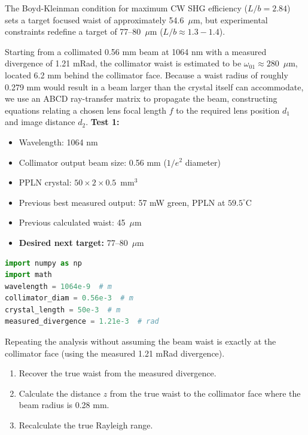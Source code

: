 \documentclass[11pt, letterpaper]{article}
\begin{document}
The Boyd-Kleinman condition for maximum CW SHG efficiency ($L/b = 2.84$) sets a target focused waist of approximately 54.6~$\mu$m, but experimental constraints redefine a target of 77--80~$\mu$m ($L/b \approx 1.3-1.4$). 

Starting from a collimated 0.56 mm beam at 1064 nm with a measured divergence of 1.21 mRad, the collimator waist is estimated to be $\omega_{01} \approx 280$~$\mu$m, located 6.2 mm behind the collimator face. Because a waist radius of roughly 0.279 mm would result in a beam larger than the crystal itself can accommodate, we use an ABCD ray-transfer matrix to propagate the beam, constructing equations relating a chosen lens focal length $f$ to the required lens position $d_{1}$ and image distance $d_{2}$.
\textbf{Test 1:}
\begin{itemize}
    \item Wavelength: 1064 nm
    \item Collimator output beam size: 0.56 mm ($1/e^2$ diameter)
    \item PPLN crystal: $50 \times 2 \times 0.5$~mm$^3$
    \item Previous best measured output: 57 mW green, PPLN at $59.5^\circ$C
    \item Previous calculated waist: 45~$\mu$m
    \item \textbf{Desired next target:} 77--80~$\mu$m
\end{itemize}

\begin{lstlisting}[language=Python]
import numpy as np
import math
wavelength = 1064e-9  # m
collimator_diam = 0.56e-3  # m
crystal_length = 50e-3  # m
measured_divergence = 1.21e-3  # rad
\end{lstlisting}

Repeating the analysis without assuming the beam waist is exactly at the collimator face (using the measured 1.21 mRad divergence).
\begin{enumerate}
\item Recover the true waist from the measured divergence.
\item Calculate the distance $z$ from the true waist to the collimator face where the beam radius is 0.28 mm.
\item Recalculate the true Rayleigh range.
\end{enumerate}
\end{document}
